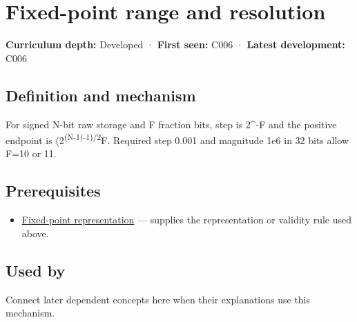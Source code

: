 \hypertarget{appendix-ceb4c4a9b5a1}{}\label{referencestart:appendix-ceb4c4a9b5a1}
\section{Fixed-point range and resolution}\label{appendix-ceb4c4a9b5a1-fixed-point-range-and-resolution}

\hypertarget{appendix-ceb4c4a9b5a1-fixed-point-range-and-resolution}{}

\textbf{Curriculum depth:} Developed · \textbf{First seen:} C006 · \textbf{Latest development:} C006

\begin{allmightroledefinition}

\subsection{Definition and mechanism}\label{appendix-ceb4c4a9b5a1-definition-and-mechanism}

\hypertarget{appendix-ceb4c4a9b5a1-definition-and-mechanism}{}

For signed N-bit raw storage and F fraction bits, step is 2\^{}-F and the positive endpoint is (2\textsuperscript{(N-1)-1)/2}F. Required step 0.001 and magnitude 1e6 in 32 bits allow F=10 or 11.

\end{allmightroledefinition}

\subsection{Prerequisites}\label{appendix-ceb4c4a9b5a1-prerequisites}

\hypertarget{appendix-ceb4c4a9b5a1-prerequisites}{}

\begin{itemize}
\tightlist
\item
  \hyperref[appendix-1d0dbe8924cc]{Fixed-point representation} --- supplies the representation or validity rule used above.
\end{itemize}

\subsection{Used by}\label{appendix-ceb4c4a9b5a1-used-by}

\hypertarget{appendix-ceb4c4a9b5a1-used-by}{}

Connect later dependent concepts here when their explanations use this mechanism.

